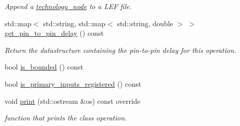 \begin{DoxyCompactItemize}
\begin{DoxyCompactList}\small\item\em Append a \hyperlink{structtechnology__node}{technology\+\_\+node} to a L\+EF file. \end{DoxyCompactList}\item 
std\+::map$<$ std\+::string, std\+::map$<$ std\+::string, double $>$ $>$ \hyperlink{structoperation_aee6103b8dad5aed3782b5e3c1c885316}{get\+\_\+pin\+\_\+to\+\_\+pin\+\_\+delay} () const
\begin{DoxyCompactList}\small\item\em Return the datastructure containing the pin-\/to-\/pin delay for this operation. \end{DoxyCompactList}\item 
bool \hyperlink{structoperation_a28d9e2b1f452d667cdf74afa81d896ea}{is\+\_\+bounded} () const
\item 
bool \hyperlink{structoperation_ab72f8bdde321945d4b616b562c4bc472}{is\+\_\+primary\+\_\+inputs\+\_\+registered} () const
\item 
void \hyperlink{structoperation_a48582638c55f54db175299d504459f70}{print} (std\+::ostream \&os) const override
\begin{DoxyCompactList}\small\item\em function that prints the class operation. \end{DoxyCompactList}\end{DoxyCompactItemize}

